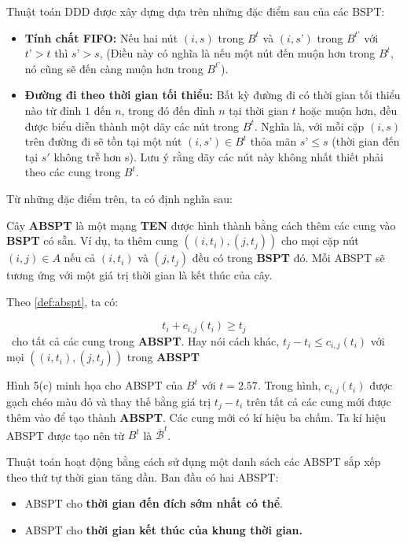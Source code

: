 \documentclass[../main.tex]{subfiles}
\begin{document}
Thuật toán DDD được xây dựng dựa trên những đặc điểm sau của các BSPT: 
\begin{itemize}
  \tightlist
  \item
    \textbf{Tính chất FIFO:} Nếu hai nút \((i, s)\) trong \(B^t\) và
    \((i, s’)\) trong \(B^{t’}\) với \(t’ > t\) thì \(s’ > s\), (Điều này
    có nghĩa là nếu một nút đến muộn hơn trong \(B^t\), nó cũng sẽ đến
    càng muộn hơn trong \(B^{t’}\)).
  \item
    \textbf{Đường đi theo thời gian tối thiểu:} Bất kỳ đường đi có thời
    gian tối thiểu nào từ đỉnh \(1\) đến \(n\), trong đó đến đỉnh \(n\)
    tại thời gian \(t\) hoặc muộn hơn, đều được biểu diễn thành một dãy
    các nút trong \(B^t\). Nghĩa là, với mỗi cặp \((i, s)\) trên đường đi
    sẽ tồn tại một nút \((i, s’) \in B^t\) thỏa mãn \(s’ \le s\) (thời
    gian đến tại \(s'\) không trễ hơn s). Lưu ý rằng dãy các nút này không
    nhất thiết phải theo các cung trong \(B^t\).
  \end{itemize}

Từ những đặc điểm trên, ta có định nghĩa sau:

\begin{definition}
\label{def:abspt}  
Cây \textbf{ABSPT} là một mạng \textbf{TEN} được hình thành bằng cách
thêm các cung vào \textbf{BSPT} có sẵn. Ví dụ, ta thêm cung
\(((i, t_i), (j, t_j))\) cho mọi cặp nút \((i, j) \in A\) nếu cả
\((i, t_i)\) và \((j, t_j)\) đều có trong \textbf{BSPT} đó. Mỗi ABSPT sẽ tương 
ứng với một giá trị thời gian là kết thúc của cây.
\end{definition}

Theo \autoref{def:abspt}, ta có:

  \[t_i + c_{i,j}(t_i) \ge t_j\]~cho tất cả các cung trong
  \textbf{ABSPT}. Hay nói cách khác, \(t_j - t_i \le c_{i,j}(t_i)\) với mọi
  \(((i, t_i), (j, t_j))\) trong \textbf{ABSPT}

Hình 5(c) minh họa
cho ABSPT của \(B^t\) với \(t = 2.57\). Trong hình, \(c_{i,j}(t_i)\)
được gạch chéo màu đỏ và thay thế bằng giá trị \(t_j - t_i\) trên tất cả
các cung mới được thêm vào để tạo thành \textbf{ABSPT}. Các cung mới có
kí hiệu ba chấm. Ta kí hiệu ABSPT được tạo nên từ \(B^t\) là
\(\overline{\mathcal B}^t\).

Thuật toán hoạt động bằng cách sử dụng một danh sách các ABSPT
sắp xếp theo thứ tự thời gian tăng dần. Ban đầu có hai ABSPT:

\begin{itemize}
\tightlist
\item
  ABSPT cho \textbf{thời gian đến đích sớm nhất có thể}.
\item
  ABSPT cho \textbf{thời gian kết thúc của khung thời gian.}
\end{itemize}
\end{document}
